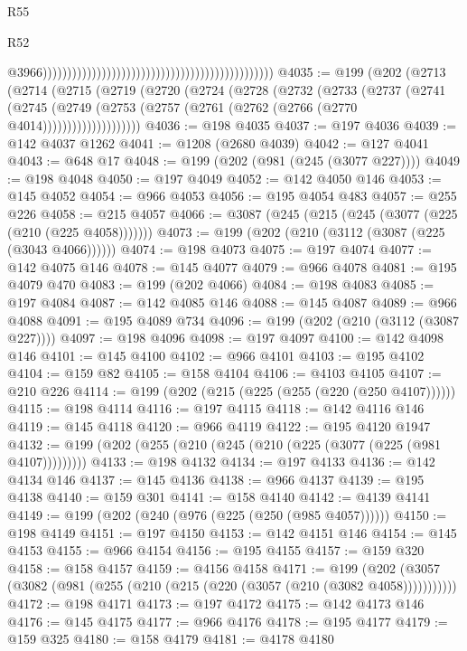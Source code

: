 \begin{lexlean}{R55}
\begin{lexlean}{R52}
\begin{coremodule}
{{{{{{{{{{{{{{{{{{{{{{{{{{{{{{{{{{{{{{{{{{{{{{{{{{{{{{{{{{{{{{{{{{{{{{{{{{{{{{{{{{{{{{{{{{{{{{{{{{{{{{{{{{{{{{{{{{{{{{{{{{{{{{{{{{{{{{{{{{{{{{{{{{{{{{{{{{{{{{{{{{{{{{{{{{{{{{{{{{{{{{{{{{{{{{{{{{{{{{                                                                                                  @3966)))))))))))))))))))))))))))))))))))))))))))))))
@4035 := @199
    (@202
      (@2713
        (@2714
          (@2715
            (@2719
              (@2720
                (@2724
                  (@2728
                    (@2732
                      (@2733
                        (@2737
                          (@2741
                            (@2745
                              (@2749
                                (@2753 (@2757 (@2761 (@2762 (@2766 (@2770 @4014))))))))))))))))))))
@4036 := @198 @4035
@4037 := @197 @4036
@4039 := @142 @4037 @1262
@4041 := @1208 (@2680 @4039)
@4042 := @127 @4041
@4043 := @648 @17
@4048 := @199 (@202 (@981 (@245 (@3077 @227))))
@4049 := @198 @4048
@4050 := @197 @4049
@4052 := @142 @4050 @146
@4053 := @145 @4052
@4054 := @966 @4053
@4056 := @195 @4054 @483
@4057 := @255 @226
@4058 := @215 @4057
@4066 := @3087 (@245 (@215 (@245 (@3077 (@225 (@210 (@225 @4058)))))))
@4073 := @199 (@202 (@210 (@3112 (@3087 (@225 (@3043 @4066))))))
@4074 := @198 @4073
@4075 := @197 @4074
@4077 := @142 @4075 @146
@4078 := @145 @4077
@4079 := @966 @4078
@4081 := @195 @4079 @470
@4083 := @199 (@202 @4066)
@4084 := @198 @4083
@4085 := @197 @4084
@4087 := @142 @4085 @146
@4088 := @145 @4087
@4089 := @966 @4088
@4091 := @195 @4089 @734
@4096 := @199 (@202 (@210 (@3112 (@3087 @227))))
@4097 := @198 @4096
@4098 := @197 @4097
@4100 := @142 @4098 @146
@4101 := @145 @4100
@4102 := @966 @4101
@4103 := @195 @4102
@4104 := @159 @82
@4105 := @158 @4104
@4106 := @4103 @4105
@4107 := @210 @226
@4114 := @199 (@202 (@215 (@225 (@255 (@220 (@250 @4107))))))
@4115 := @198 @4114
@4116 := @197 @4115
@4118 := @142 @4116 @146
@4119 := @145 @4118
@4120 := @966 @4119
@4122 := @195 @4120 @1947
@4132 := @199 (@202 (@255 (@210 (@245 (@210 (@225 (@3077 (@225 (@981 @4107)))))))))
@4133 := @198 @4132
@4134 := @197 @4133
@4136 := @142 @4134 @146
@4137 := @145 @4136
@4138 := @966 @4137
@4139 := @195 @4138
@4140 := @159 @301
@4141 := @158 @4140
@4142 := @4139 @4141
@4149 := @199 (@202 (@240 (@976 (@225 (@250 (@985 @4057))))))
@4150 := @198 @4149
@4151 := @197 @4150
@4153 := @142 @4151 @146
@4154 := @145 @4153
@4155 := @966 @4154
@4156 := @195 @4155
@4157 := @159 @320
@4158 := @158 @4157
@4159 := @4156 @4158
@4171 := @199 (@202 (@3057 (@3082 (@981 (@255 (@210 (@215 (@220 (@3057 (@210 (@3082 @4058)))))))))))
@4172 := @198 @4171
@4173 := @197 @4172
@4175 := @142 @4173 @146
@4176 := @145 @4175
@4177 := @966 @4176
@4178 := @195 @4177
@4179 := @159 @325
@4180 := @158 @4179
@4181 := @4178 @4180
}}}}}}}}}}}}}}}}}}}}}}}}}}}}}}}}}}}}}}}}}}}}}}}}}}}}}}}}}}}}}}}}}}}}}}}}}}}}}}}}}}}}}}}}}}}}}}}}}}}}}}}}}}}}}}}}}}}}}}}}}}}}}}}}}}}}}}}}}}}}}}}}}}}}}}}}}}}}}}}}}}}}}}}}}}}}}}}}}}}}}}}}}}}}}}}}}}}}}}
\end{coremodule}
\end{lexlean}
\end{lexlean}
